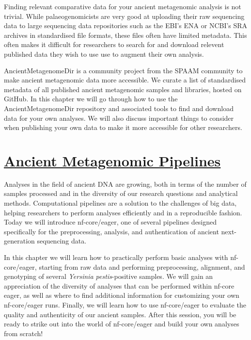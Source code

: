 \documentclass[
  letterpaper,
]{book}
\begin{document}

Finding relevant comparative data for your ancient metagenomic analysis
is not trivial. While palaeogenomicists are very good at uploading their
raw sequencing data to large sequencing data repositories such as the
EBI's ENA or NCBI's SRA archives in standardised file formats, these
files often have limited metadata. This often makes it difficult for
researchers to search for and download relevent published data they wish
to use use to augment their own analysis.

AncientMetagenomeDir is a community project from the SPAAM community to
make ancient metagenomic data more accessible. We curate a list of
standardised metadata of all published ancient metagenomic samples and
libraries, hosted on GitHub. In this chapter we will go through how to
use the AncientMetagenomeDir repository and associated tools to find and
download data for your own analyses. We will also discuss important
things to consider when publishing your own data to make it more
accessible for other researchers.

\hypertarget{ancient-metagenomic-pipelines}{%
\section*{\texorpdfstring{\protect\hyperlink{ancient-metagenomic-pipelines-1}{Ancient
Metagenomic
Pipelines}}{Ancient Metagenomic Pipelines}}\label{ancient-metagenomic-pipelines}}


Analyses in the field of ancient DNA are growing, both in terms of the
number of samples processed and in the diversity of our research
questions and analytical methods. Computational pipelines are a solution
to the challenges of big data, helping researchers to perform analyses
efficiently and in a reproducible fashion. Today we will introduce
nf-core/eager, one of several pipelines designed specifically for the
preprocessing, analysis, and authentication of ancient next-generation
sequencing data.

In this chapter we will learn how to practically perform basic analyses
with nf-core/eager, starting from raw data and performing preprocessing,
alignment, and genotyping of several \emph{Yersinia pestis}-positive
samples. We will gain an appreciation of the diversity of analyses that
can be performed within nf-core eager, as well as where to find
additional information for customizing your own nf-core/eager runs.
Finally, we will learn how to use nf-core/eager to evaluate the quality
and authenticity of our ancient samples. After this session, you will be
ready to strike out into the world of nf-core/eager and build your own
analyses from scratch!
\end{document}
